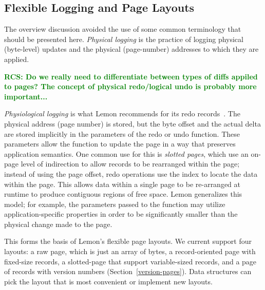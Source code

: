 \documentclass[letterpaper,twocolumn,english]{article}
\newcommand{\yad}{Lemon\xspace}
\newcommand{\rcs}[1]{\textcolor{green}{\bf RCS: #1}}
\begin{document}
%


\subsection{Flexible Logging and Page Layouts}
\label{flex-logging}
\label{page-layouts}

The overview discussion avoided the use of some common terminology 
that should be presented here. {\em Physical logging } 
is the practice of logging physical (byte-level) updates
and the physical (page-number) addresses to which they are applied.

\rcs{Do we really need to differentiate between types of diffs appiled to pages?  The concept of physical redo/logical undo is probably more important...}

{\em Physiological logging } is what \yad recommends for its redo
records~\cite{physiological}. The physical address (page number) is
stored, but the byte offset and the actual delta are stored implicitly
in the parameters of the redo or undo function. These parameters allow
the function to update the page in a way that preserves application
semantics.  One common use for this is {\em slotted pages}, which use
an on-page level of indirection to allow records to be rearranged
within the page; instead of using the page offset, redo operations use
the index to locate the data within the page. This allows data within a single
page to be re-arranged at runtime to produce contiguous regions of
free space. \yad generalizes this model; for example, the parameters
passed to the function may utilize application-specific properties in
order to be significantly smaller than the physical change made to the
page.

This forms the basis of \yad's flexible page layouts.  We current
support four layouts: a raw page, which is just an array of
bytes, a record-oriented page with fixed-size records,
a slotted-page that support variable-sized records, and a page of records with version numbers (Section~\ref{version-pages}).
Data structures can pick the layout that is most convenient or implement 
new layouts.
\end{document}
